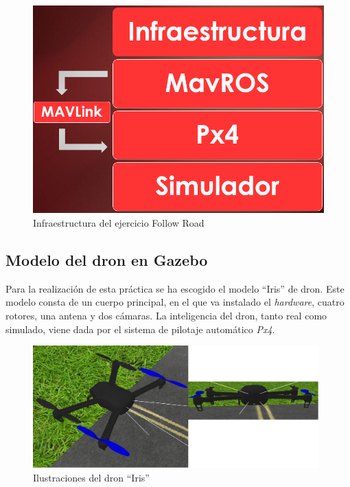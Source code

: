 \begin{figure}[H]
  \begin{center}
    \includegraphics[width=0.4\linewidth, height=8cm]{figures/infraestructura_fr.png}
		\caption{Infraestructura del ejercicio Follow Road}
		\label{fig.infraestructura_fr}
		\end{center}
\end{figure}

\subsection{Modelo del dron en Gazebo}
Para la realización de esta práctica se ha escogido el modelo ``Iris'' de dron. Este modelo consta de un cuerpo principal, en el que va instalado el \textit{hardware}, cuatro rotores, una antena y dos cámaras. La inteligencia del dron, tanto real como simulado, viene dada por el sistema de pilotaje automático \textit{Px4}.

\begin{figure}[H]
	\begin{center}
	    \includegraphics[width=0.98\textwidth]{figures/iris.png}
		\caption{Ilustraciones del dron ``Iris''}
		\label{fig.iris}
	\end{center}
\end{figure}

